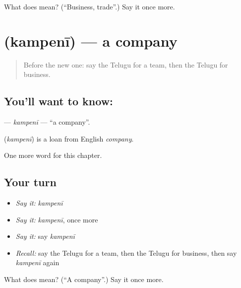 \begin{tcolorbox}[breakable,colback=teal!4,colframe=teal!35!black,title={Before you move on}]
What does  mean? (\textquotedblleft{}Business, trade\textquotedblright{}.) Say it once more.
\end{tcolorbox}
\section[\texorpdfstring{\te{కంపెనీ} (kampenī)}{కంపెనీ (kampenī)}]{ (kampenī) — a company}

\label{lesson:TE-C236-kampeni}



\begin{quote}
Before the new one: say the Telugu for a team, then the Telugu for business.
\end{quote}

\subsection*{You'll want to know: }
\textbf{} — \emph{kampenī} — \textquotedblleft{}a company\textquotedblright{}.

\begin{cousinweb}
\textbf{} (\emph{kampenī}) is a loan from English \emph{company}.
\end{cousinweb}

\begin{grammarlens}[title={What you've built}]
One more word for this chapter.
\end{grammarlens}

\subsection*{Your turn}
\begin{itemize}
\raggedright
  \item \emph{Say it:} \emph{kampenī}
  \item \emph{Say it:} \emph{kampenī}, once more
  \item \emph{Say it:} say \emph{kampenī}
  \item \emph{Recall:} say the Telugu for a team, then the Telugu for business, then say \emph{kampenī} again
\end{itemize}

\begin{tcolorbox}[breakable,colback=teal!4,colframe=teal!35!black,title={Before you move on}]
What does  mean? (\textquotedblleft{}A company\textquotedblright{}.) Say it once more.
\end{tcolorbox}
